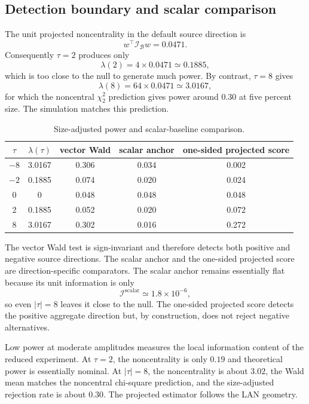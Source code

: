 \documentclass[11pt,a4paper]{amsart}
\theoremstyle{plain}
\theoremstyle{definition}
\theoremstyle{remark}
\newcommand{\scrB}{\mathcal{B}}
\newcommand{\scrI}{\mathcal{I}}
\begin{document}
\subsection{Detection boundary and scalar comparison}

The unit projected noncentrality in the default source direction is
\[
        w^\top \scrI_{\scrB}w
        =
        0.0471.
\]
Consequently \(\tau=2\) produces only
\[
        \lambda(2)=4\times0.0471\simeq0.1885,
\]
which is too close to the null to generate much power.  By contrast, \(\tau=8\) gives
\[
        \lambda(8)=64\times0.0471\simeq3.0167,
\]
for which the noncentral \(\chi^2_2\) prediction gives power around \(0.30\) at five percent size.
The simulation matches this prediction.

\begin{table}[htbp]
\centering
\caption{Size-adjusted power and scalar-baseline comparison.}
\label{tab:size-adjusted-power}
\begin{tabular}{ccccc}
\toprule
\(\tau\) & \(\lambda(\tau)\) & vector Wald & scalar anchor & one-sided projected score\\
\midrule
\(-8\) & 3.0167 & 0.306 & 0.034 & 0.002\\
\(-2\) & 0.1885 & 0.074 & 0.020 & 0.024\\
0 & 0 & 0.048 & 0.048 & 0.048\\
2 & 0.1885 & 0.052 & 0.020 & 0.072\\
8 & 3.0167 & 0.302 & 0.016 & 0.272\\
\bottomrule
\end{tabular}
\end{table}

The vector Wald test is sign-invariant and therefore detects both positive and negative source
directions.  The scalar anchor and the one-sided projected score are direction-specific comparators.
The scalar anchor remains essentially flat because its unit information is only
\[
        \scrI^{\mathrm{scalar}}\simeq1.8\times10^{-6},
\]
so even \(|\tau|=8\) leaves it close to the null.  The one-sided projected score detects the
positive aggregate direction but, by construction, does not reject negative alternatives.

Low power at moderate amplitudes measures the local information content of the reduced experiment.
At \(\tau=2\), the noncentrality is only \(0.19\) and theoretical power is essentially nominal.  At \(|\tau|=8\), the noncentrality is about
\(3.02\), the Wald mean matches the noncentral chi-square prediction, and the size-adjusted
rejection rate is about \(0.30\).  The projected estimator follows the LAN geometry.
\end{document}
